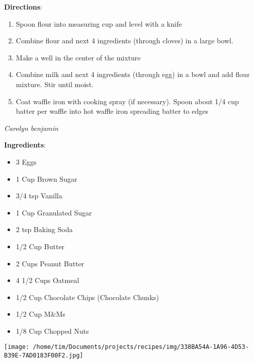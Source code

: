 \documentclass[11pt, twoside, openany]{book}
\begin{document}
\textbf{Directions}:
\vspace{-3mm}\begin{enumerate}\setlength\itemsep{-1mm}
\item Spoon flour into measuring cup and level with a knife
\item Combine flour and next 4 ingredients (through cloves) in a large bowl.
\item Make a well in the center of the mixture
\item Combine milk and next 4 ingredients (through egg) in a bowl and add flour mixture. Stir until moist.
\item Coat waffle iron with cooking spray (if necessary). Spoon about 1/4 cup batter per waffle into hot waffle iron spreading batter to edges
\end{enumerate}
 \label{monster-cookies}\hfill\textit{Carolyn benjamin}\\
\begin{minipage}[t]{0.8\linewidth}
\textbf{Ingredients}:\vspace{-3mm}
\begin{multicols}{2}
\begin{itemize}\setlength\itemsep{-1mm}
\item 3 Eggs
\item 1 Cup Brown Sugar
\item 3/4 tsp Vanilla
\item 1 Cup Granulated Sugar
\item 2 tsp Baking Soda
\item 1/2 Cup Butter
\item 2 Cups Peanut Butter
\item 4 1/2 Cups Oatmeal
\item 1/2 Cup Chocolate Chips (Chocolate Chunks)
\item 1/2 Cup M&Ms
\item 1/8 Cup Chopped Nuts
\end{itemize}
\end{multicols}
\end{minipage}
\begin{minipage}[t]{0.2\linewidth}
\centering \strut\vspace*{-\baselineskip}\newline
\texttt{[image: /home/tim/Documents/projects/recipes/img/338BA54A-1A96-4D53-B39E-7AD0183F00F2.jpg]}\\
\end{minipage}\vspace{3mm}
\end{document}
